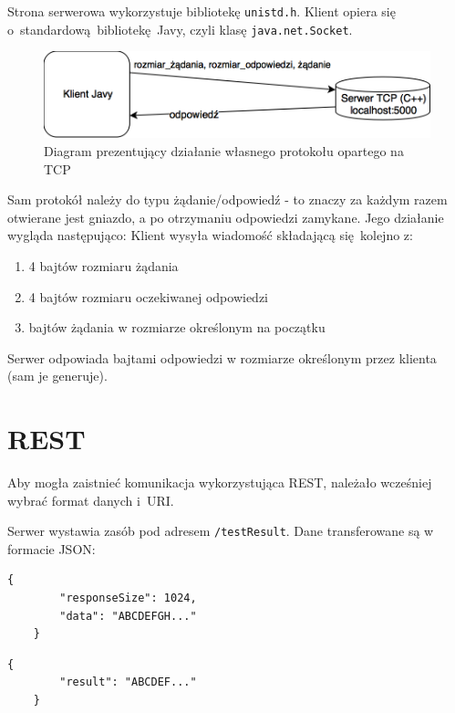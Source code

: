 Strona serwerowa wykorzystuje bibliotekę \texttt{unistd.h}. Klient opiera się o~standardową bibliotekę Javy, czyli klasę \texttt{java.net.Socket}.

\begin{figure}[h!]
    \centering
    \includegraphics[width=\textwidth,height=\textheight,keepaspectratio]{img/tcp_impl_diagram.png}
    \caption{Diagram prezentujący działanie własnego protokołu opartego na TCP}
\end{figure}

Sam protokół należy do typu żądanie/odpowiedź - to znaczy za każdym razem otwierane jest gniazdo, a po otrzymaniu odpowiedzi zamykane. Jego działanie wygląda następująco:
\newline
Klient wysyła wiadomość składającą się kolejno z:
\begin{enumerate}
    \item 4 bajtów rozmiaru żądania
    \item 4 bajtów rozmiaru oczekiwanej odpowiedzi
    \item bajtów żądania w rozmiarze określonym na początku
\end{enumerate}
Serwer odpowiada bajtami odpowiedzi w rozmiarze określonym przez klienta (sam je generuje).


\section{REST}

Aby mogła zaistnieć komunikacja wykorzystująca REST, należało wcześniej wybrać format danych i~URI.

Serwer wystawia zasób pod adresem \texttt{/testResult}. Dane transferowane są w formacie JSON:
\begin{lstlisting}[caption={Format danych wysyłany przez klienta},captionpos=b]
    {
        "responseSize": 1024,
        "data": "ABCDEFGH..."
    }
\end{lstlisting}

\begin{lstlisting}[caption={Format danych zwracany przez serwer},captionpos=b]
    {
        "result": "ABCDEF..."
    }
\end{lstlisting}

